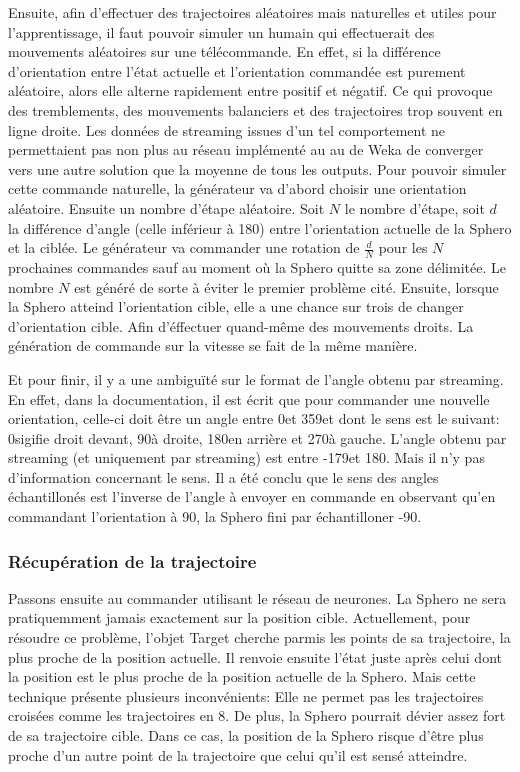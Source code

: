 Ensuite, afin d'effectuer des trajectoires aléatoires mais naturelles et utiles pour l'apprentissage, il faut pouvoir simuler un humain qui effectuerait des mouvements aléatoires sur une télécommande.
En effet, si la différence d'orientation entre l'état actuelle et l'orientation commandée est purement aléatoire, alors elle alterne rapidement entre positif et négatif.
Ce qui provoque des tremblements, des mouvements balanciers et des trajectoires trop souvent en ligne droite.
Les données de streaming issues d'un tel comportement ne permettaient pas non plus au réseau implémenté au au \mlp de Weka de converger vers une autre solution que la moyenne de tous les outputs.
Pour pouvoir simuler cette commande naturelle, la générateur va d'abord choisir une orientation aléatoire.
Ensuite un nombre d'étape aléatoire.
Soit $N$ le nombre d'étape, soit $d$ la différence d'angle (celle inférieur à 180\textdegree) entre l'orientation actuelle de la Sphero et la ciblée.
Le générateur va commander une rotation de $\frac{d}{N}$ pour les $N$ prochaines commandes sauf au moment où la Sphero quitte sa zone délimitée.
Le nombre $N$ est généré de sorte à éviter le premier problème cité.
Ensuite, lorsque la Sphero atteind l'orientation cible, elle a une chance sur trois de changer d'orientation cible.
Afin d'éffectuer quand-même des mouvements droits.
La génération de commande sur la vitesse se fait de la même manière.

Et pour finir, il y a une ambiguïté sur le format de l'angle obtenu par streaming.
En effet, dans la documentation, il est écrit que pour commander une nouvelle orientation, celle-ci doit être un angle entre 0\textdegree et 359\textdegree et dont le sens est le suivant:
0\textdegree sigifie droit devant, 90\textdegree à droite, 180\textdegree en arrière et 270\textdegree à gauche.\cite{SDKofficiels}
L'angle obtenu par streaming (et uniquement par streaming) est entre -179\textdegree et 180\textdegree.
Mais il n'y pas d'information concernant le sens.
Il a été conclu que le sens des angles échantillonés est l'inverse de l'angle à envoyer en commande en observant qu'en commandant l'orientation à 90\textdegree, la Sphero fini par échantilloner -90\textdegree.

\subsubsection{Récupération de la trajectoire}
Passons ensuite au commander utilisant le réseau de neurones.
La Sphero ne sera pratiquemment jamais exactement sur la position cible.
Actuellement, pour résoudre ce problème, l'objet Target cherche parmis les points de sa trajectoire, la plus proche de la position actuelle.
Il renvoie ensuite l'état juste après celui dont la position est le plus proche de la position actuelle de la Sphero.
Mais cette technique présente plusieurs inconvénients:
Elle ne permet pas les trajectoires croisées comme les trajectoires en 8.
De plus, la Sphero pourrait dévier assez fort de sa trajectoire cible.
Dans ce cas, la position de la Sphero risque d'être plus proche d'un autre point de la trajectoire que celui qu'il est sensé atteindre.
